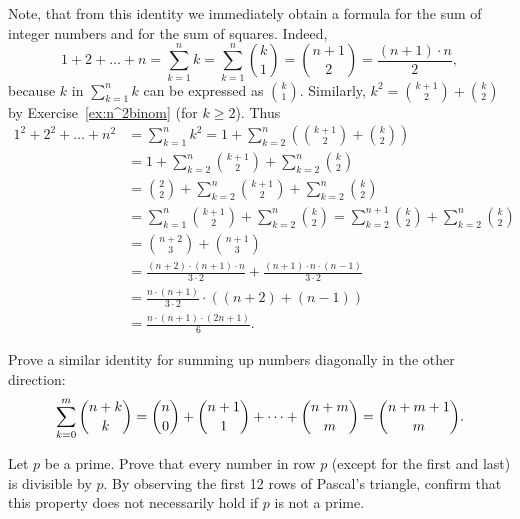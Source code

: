 Note, that from this identity we immediately obtain a formula for the sum of integer numbers and for the sum of squares. 
Indeed, 
\[
1 + 2 + \dots + n = \sum_{k=1}^n {k} = \sum_{k=1}^n \binom{k}{1} = \binom{n+1}{2} = \frac{(n+1) \cdot n}{2}, 
\]
because $k$ in $\sum_{k=1}^n k$ can be expressed as $\binom{k}{1}$. 
Similarly, $k^2 = \binom{k+1}{2} + \binom{k}{2}$ by Exercise~\ref{ex:n^2binom} (for $k\geq 2$). 
Thus 
\begin{align*}
1^2 + 2^2 + \dots + n^2 &= \sum_{k=1}^n k^2 = 1 + \sum_{k=2}^n \left(\binom{k+1}{2} + \binom{k}{2}\right) \\
&= 1 + \sum_{k=2}^n \binom{k+1}{2} + \sum_{k=2}^n \binom{k}{2} \\
&= \binom{2}{2} + \sum_{k=2}^n \binom{k+1}{2} + \sum_{k=2}^n \binom{k}{2} \\
&= \sum_{k=1}^{n} \binom{k+1}{2} + \sum_{k=2}^n \binom{k}{2} = \sum_{k=2}^{n+1} \binom{k}{2} + \sum_{k=2}^n \binom{k}{2} \\
&= \binom{n+2}{3} + \binom{n+1}{3} \\
&= \frac{(n+2) \cdot (n+1) \cdot n}{3 \cdot 2} + \frac{(n+1) \cdot n \cdot (n-1)}{3 \cdot 2} \\
&= \frac{n \cdot (n+1)}{3 \cdot 2} \cdot \left( (n+2)+ (n-1) \right) \\
&= \frac{n \cdot (n+1) \cdot (2n+1)}{6}. 
\end{align*}

\begin{exercise}\label{ex:diagonal}
Prove a similar identity for summing up numbers diagonally in the other direction:
\begin{equation}%
\notag \sum_{k=0}^m \binom{n+k}{k} = \binom{n}{0} + \binom{n+1}{1} + \dots + \binom{n+m}{m} = \binom{n+m+1}{m}. 
\end{equation}
\end{exercise}

\begin{exercise}\label{ex:rowp}
Let $p$ be a prime. 
Prove that every number in row $p$ (except for the first and last) is divisible by $p$. 
By observing the first 12 rows of Pascal's triangle, 
confirm that this property does not necessarily hold if $p$ is not a prime. 
\end{exercise}
